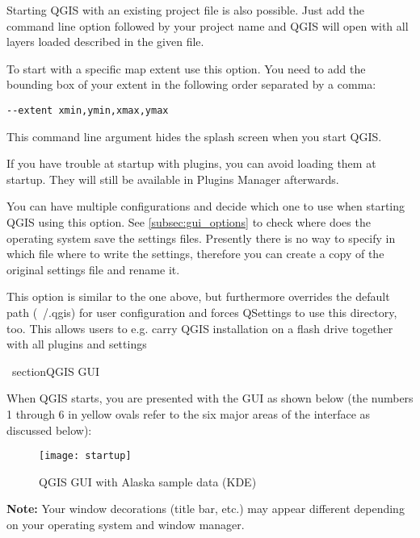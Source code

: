 Starting QGIS with an existing project file is also possible. Just
add the command line option  followed by your project
name and QGIS will open with all layers loaded described in the given file.

To start with a specific map extent use this option. You need to add the bounding box of your extent in the following order separated by a comma:
\begin{verbatim}
--extent xmin,ymin,xmax,ymax
\end{verbatim}

This command line argument hides the splash screen when you start QGIS.

If you have trouble at startup with plugins, you can avoid loading them at startup. They will still be available in Plugins Manager afterwards.

You can have multiple configurations and decide which one to use when starting QGIS using this option. See \ref{subsec:gui_options} to check where does the operating system save the settings files. Presently there is no way to specify in which file where to write the settings, therefore you can create a copy of the original settings file and rename it.

This option is similar to the one above, but furthermore overrides the default path (~/.qgis) for user configuration and forces QSettings to use this directory, too. This allows users to e.g. carry QGIS installation on a flash drive together with all plugins and settings
 
\ section{QGIS GUI}
\label{label_qgismainwindow}

When QGIS starts, you are presented with the GUI as shown below
(the numbers 1 through 6 in yellow ovals refer to the six major areas of the
interface as discussed below):

\begin{figure}[ht]
   \centering
    \texttt{[image: startup]}
    \caption{QGIS GUI with Alaska sample data \nixcaption (KDE)} \label{fig:startup}
\end{figure}

\textbf{Note:} Your window decorations (title bar, etc.) may appear
different depending on your operating system and window manager.\\

